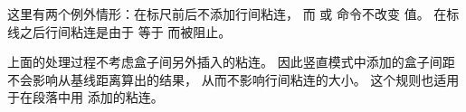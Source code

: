 \documentclass{book}
\begin{document}
这里有两个例外情形：在标尺前后不添加行间粘连，
而  或  命令不改变  值。
在标线之后行间粘连是由于  等于 \n{-1000pt} 而被阻止。

上面的处理过程不考虑盒子间另外插入的粘连。
因此竖直模式中添加的盒子间距不会影响从基线距离算出的结果，
从而不影响行间粘连的大小。
这个规则也适用于在段落中用  添加的粘连。
\end{document}
